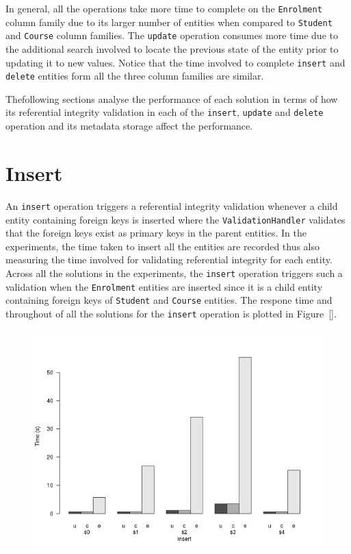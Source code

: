 	
	
% 	

	In general, all the operations take more time to complete on the
	\texttt{Enrolment} column family due to its larger number of entities 
	when compared to \texttt{Student} and \texttt{Course} column families. The
	\texttt{update} operation consumes more time due to the additional search
	involved to locate the previous state of the entity prior to updating it to new
	values. Notice that the time involved to complete \texttt{insert} and
	\texttt{delete} entities form all the three column families are similar.
	
	Thefollowing sections analyse the performance of each solution  in
	terms of how its referential integrity validation in each of the
	\texttt{insert}, \texttt{update} and \texttt{delete} operation and its
	metadata storage affect the performance.
	
\section{Insert}\label{sr:insert}
An \texttt{insert} operation triggers a referential integrity validation
whenever a child entity containing foreign keys is inserted where the
\texttt{ValidationHandler} validates that the foreign keys exist as primary keys in the parent
entities. 
In the experiments, the time taken to insert all the
entities are recorded thus also measuring the time involved for validating
referential integrity for each entity. Across all the solutions in the
experiments, the \texttt{insert} operation triggers such a validation when the
\texttt{Enrolment} entities are inserted since it is a child entity containing
foreign keys of \texttt{Student} and \texttt{Course} entities.
The respone time and throughout of all the solutions for the \texttt{insert}
operation is plotted in Figure~\ref{}.
	\begin{figure}[H] \centering
	\includegraphics[width=.8\textwidth]{./figure/result/op-insert-barplot.png}
		\caption{}\label{fr:response-insert}
	\end{figure}
	
